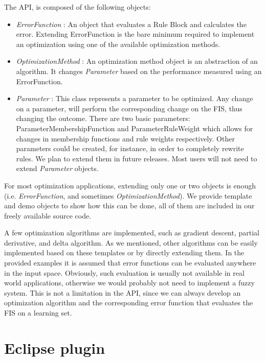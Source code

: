 \documentclass[11pt,twoside]{article}
\begin{document}
\begin{multicols}{2}
The API, is composed of the following objects:

\begin{itemize}
	\item \textit{ErrorFunction} : An object that evaluates a Rule Block and calculates the error. 
		Extending ErrorFunction is the bare minimum required to implement an optimization using one of the available optimization methods.

	\item \textit{OptimizationMethod} : An optimization method object is an abstraction of an algorithm. It changes \textit{Parameter} based on the performance measured using an ErrorFunction.

	\item \textit{Parameter} : This class represents a parameter to be optimized. 
		Any change on a parameter, will perform the corresponding change on the FIS, thus changing the outcome.
		There are two basic parameters: ParameterMembershipFunction and ParameterRuleWeight which allows for changes in membership functions and rule weights respectively. 
		Other parameters could be created, for instance, in order to completely rewrite rules. 
		We plan to extend them in future releases. 
		Most users will not need to extend \textit{Parameter} objects.

\end{itemize}

For most optimization applications, extending only one or two objects is enough (i.e. \textit{ErrorFunction}, and sometimes \textit{OptimizationMethod}).
We provide template and demo objects to show how this can be done, all of them are included in our freely available source code.

A few optimization algorithms are implemented, such as gradient descent, partial derivative, and delta algorithm.
As we mentioned, other algorithms can be easily implemented based on these templates or by directly extending them.
In the provided examples it is assumed that error functions can be evaluated anywhere in the input space.
Obviously, such evaluation is usually not available in real world applications, otherwise we would probably not need to implement a fuzzy system.
This is not a limitation in the API, since we can always develop an optimization algorithm and the corresponding error function that evaluates the FIS on a learning set.


\section{Eclipse plugin\label{sec:pluggin}}


\end{multicols}
\end{document}
